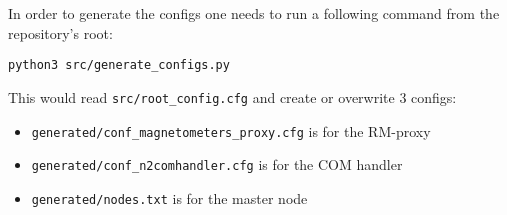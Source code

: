 In order to generate the configs one needs to run a following command from the repository's root:
\begin{verbatim}
python3 src/generate_configs.py
\end{verbatim}
This would read \texttt{src/root\_config.cfg} and create or overwrite 3 configs:

\begin{itemize}
	\item \texttt{generated/conf\_magnetometers\_proxy.cfg} is for the RM-proxy
	\item \texttt{generated/conf\_n2comhandler.cfg} is for the COM handler
	\item \texttt{generated/nodes.txt} is for the master node
\end{itemize}



